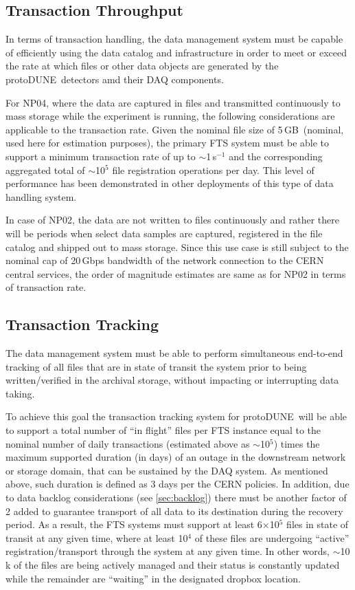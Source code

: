 \documentclass[pdftex,12pt,letter]{article}
\newcommand{\pd}{protoDUNE\ }
\newcommand{\filesize}{5\,GB\ }
\begin{document}
\subsection{Transaction Throughput}

In terms of transaction handling,  the data management system must be capable of efficiently using the data
catalog and infrastructure in order to meet or exceed the rate at which files or other data
objects are generated by the \pd detectors amd their DAQ components.

For NP04, where the data are captured in files and transmitted continuously to mass storage while
the experiment is running, the following considerations are applicable to the transaction rate.
Given the nominal file size of \filesize (nominal, used here for estimation purposes), 
the primary FTS system must be able to support a minimum transaction rate of up to  $\sim$1\,s$^{-1}$
and the corresponding aggregated total of $\sim$10$^5$ file registration operations per day.
This level of performance has been demonstrated in other deployments of this type of data
handling system.

In case of NP02, the data are not written to files continuously and rather there will be periods when
select data samples are captured, registered in the file catalog and shipped out to mass storage.
Since this use case is still subject to the nominal cap of 20\,Gbps bandwidth of the network connection
to the CERN central services, the order of magnitude estimates are same as for NP02 in terms of transaction rate.

\subsection{Transaction Tracking}
The data management system must be able to perform simultaneous end-to-end tracking
of all files that are in state of transit the system prior to being written/verified in the archival storage,
without impacting or interrupting data taking. 

To achieve this goal the transaction tracking system for \pd will be
able to support a total number of ``in flight'' files per FTS instance equal to the nominal number of daily transactions
(estimated above as $\sim$10$^5$) times the maximum supported duration (in days)
of an outage in the downstream network or storage domain, that can be sustained by the DAQ system.
As mentioned above, such duration is defined as 3 days per the CERN policies. In addition, due to data backlog considerations
(see \ref{sec:backlog}) there must be another factor of 2 added to guarantee transport of all data to its destination during
the recovery period. As a result, the FTS systems must support at least 6$\times$10$^5$ files in state of transit at any given time,
where at least 10$^4$ of these files are undergoing ``active'' registration/transport through the system at any given time.
In other words, $\sim$10\,k of the files are being actively
managed and their status is constantly updated while the remainder are ``waiting'' in the designated dropbox location.
\end{document}
